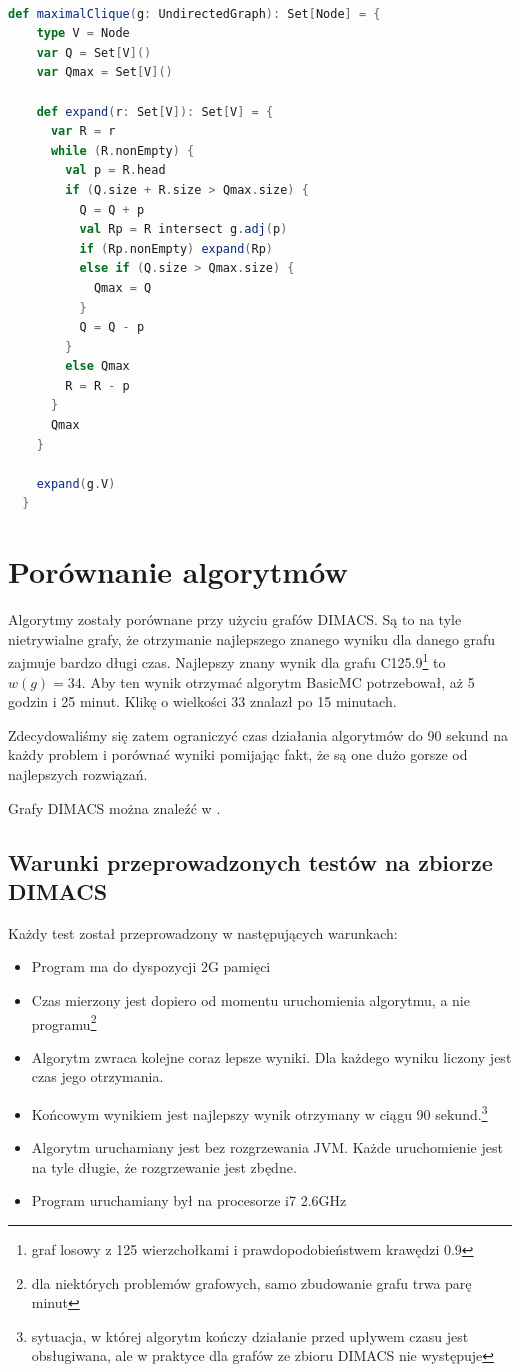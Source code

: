 \documentclass[12pt, a4paper]{article}
\begin{document}
\begin{lstlisting}[language=scala]  % Start your code-block

def maximalClique(g: UndirectedGraph): Set[Node] = {
    type V = Node
    var Q = Set[V]()
    var Qmax = Set[V]()

    def expand(r: Set[V]): Set[V] = {
      var R = r
      while (R.nonEmpty) {
        val p = R.head
        if (Q.size + R.size > Qmax.size) {
          Q = Q + p
          val Rp = R intersect g.adj(p)
          if (Rp.nonEmpty) expand(Rp)
          else if (Q.size > Qmax.size) {
            Qmax = Q
          }
          Q = Q - p
        }
        else Qmax
        R = R - p
      }
      Qmax
    }

    expand(g.V)
  }
\end{lstlisting}

\section{Porównanie algorytmów}
Algorytmy zostały porównane przy użyciu grafów DIMACS\citep{dimacs}. Są to na tyle nietrywialne grafy, że otrzymanie najlepszego znanego wyniku dla danego grafu zajmuje bardzo długi czas. Najlepszy znany wynik dla grafu C125.9\footnote{graf losowy z 125 wierzchołkami i prawdopodobieństwem krawędzi 0.9}  to $w(g)=34$. Aby ten wynik otrzymać algorytm BasicMC potrzebował, aż 5 godzin i 25 minut. Klikę o wielkości 33 znalazł po 15 minutach.

Zdecydowaliśmy się zatem ograniczyć czas działania algorytmów do 90 sekund na każdy problem i porównać wyniki pomijając fakt, że są one dużo gorsze od najlepszych rozwiązań.

Grafy DIMACS można znaleźć w \cite{dimacs}.

\subsection{Warunki przeprowadzonych testów na zbiorze DIMACS}
Każdy test został przeprowadzony w następujących warunkach:

\begin{itemize}
\item Program ma do dyspozycji 2G pamięci
\item Czas mierzony jest dopiero od momentu uruchomienia algorytmu, a nie programu\footnote{dla niektórych problemów grafowych, samo zbudowanie grafu trwa parę minut}
\item Algorytm zwraca kolejne coraz lepsze wyniki. Dla każdego wyniku liczony jest czas jego otrzymania.
\item Końcowym wynikiem jest najlepszy wynik otrzymany w ciągu 90 sekund.\footnote{sytuacja, w której algorytm kończy działanie przed upływem czasu jest obsługiwana, ale w praktyce dla grafów ze zbioru DIMACS nie występuje}
\item Algorytm uruchamiany jest bez rozgrzewania JVM. Każde uruchomienie jest na tyle długie, że rozgrzewanie jest zbędne.
\item Program uruchamiany był na procesorze i7 2.6GHz
\end{itemize}
\end{document}
